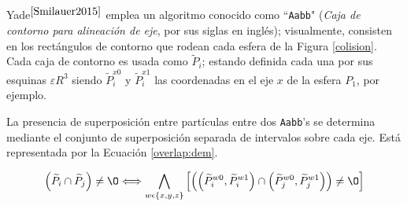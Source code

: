 Yade$^{\cite{Smilauer2015}}$ emplea un algoritmo conocido como ``\texttt{Aabb}" (\textit{Caja de contorno para alineaci\'on de eje}, por sus siglas en ingl\'es); visualmente, consisten en los rect\'angulos de contorno que rodean cada esfera de la Figura \ref{colision}. Cada caja de contorno es usada como $\widetilde{P}_i$; estando definida cada una por sus esquinas $\varepsilon R^3$ siendo $\widetilde{P}_i ^{x0}$ y $\widetilde{P}_i ^{x1}$ las coordenadas en el eje $x$ de la esfera $P_1$, por ejemplo. 

\noindent
\justify

La presencia de superposici\'on entre part\'iculas entre dos \texttt{Aabb}'s se determina mediante el conjunto de superposici\'on separada de intervalos sobre cada eje. Est\'a representada por la Ecuaci\'on \ref{overlap:dem}.

\begin{equation}
	\left(\widetilde{P}_i \cap \widetilde{P}_j \right) \neq {\O} \Longleftrightarrow \bigwedge_{w \epsilon \{x,y,z \}} \left[\left(\left(\widetilde{P}_i ^{w0}, \widetilde{P}_i ^{w1} \right) \cap \left(\widetilde{P}_j ^{w0}, \widetilde{P}_j ^{w1} \right) \right) \neq {\O} \right] 
	\label{overlap:dem}
\end{equation}